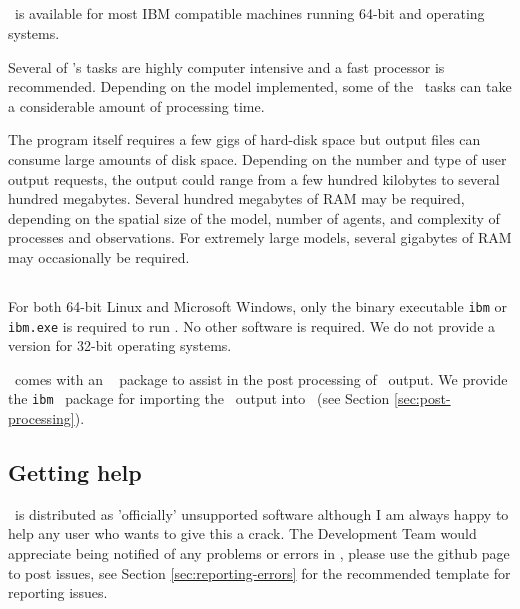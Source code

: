 \subsection{}
\IBM\ is available for most IBM compatible machines running 64-bit  and  operating systems.

Several of \IBM 's tasks are highly computer intensive and a fast processor is recommended. Depending on the model implemented, some of the \IBM\ tasks can take a considerable amount of processing time.

The program itself requires a few gigs of hard-disk space but output files can consume large amounts of disk space. Depending on the number and type of user output requests, the output could range from a few hundred kilobytes to several hundred megabytes. Several hundred megabytes of RAM may be required, depending on the spatial size of the model, number of agents, and complexity of processes and observations. For extremely large models, several gigabytes of RAM may occasionally be required. 

\subsection{}

For both 64-bit Linux and Microsoft Windows, only the binary executable \texttt{ibm} or \texttt{ibm.exe} is required to run \IBM . No other software is required. We do not provide a version for 32-bit operating systems. 

\IBM\ comes with an \href{http://www.r-project.org}{\R}\ \citep{R} package to assist in the post processing of \IBM\ output. We provide the \texttt{ibm} \R\ package for importing the \IBM\ output into \R\ (see Section \ref{sec:post-processing}).

\subsection{Getting help}

\IBM\ is distributed as 'officially' unsupported software although I am always happy to help any user who wants to give this a crack. The Development Team would appreciate being notified of any problems or errors in \IBM , please use the github page to post issues, see Section \ref{sec:reporting-errors} for the recommended template for reporting issues.

